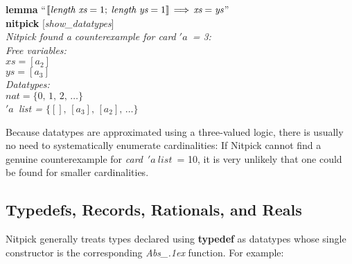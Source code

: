 \documentclass[a4paper,12pt]{article}
\def\unr{\ldots}
\begin{document}
\prew
\textbf{lemma} ``$\mathopen{[\![} \textit{length}~\textit{xs} = 1;\> \textit{length}~\textit{ys} = 1
\mathclose{]\!]} \,\Longrightarrow\, \textit{xs} = \textit{ys}$''
\\
\textbf{nitpick} [\textit{show\_datatypes}] \\[2\smallskipamount]
\slshape Nitpick found a counterexample for \textit{card} $'a$~= 3: \\[2\smallskipamount]
\hbox{}\qquad Free variables: \nopagebreak \\
\hbox{}\qquad\qquad $\textit{xs} = [a_2]$ \\
\hbox{}\qquad\qquad $\textit{ys} = [a_3]$ \\
\hbox{}\qquad Datatypes: \\
\hbox{}\qquad\qquad $\textit{nat} = \{0,\, 1,\, 2,\, \unr\}$ \\
\hbox{}\qquad\qquad $'a$~\textit{list} = $\{[],\, [a_3],\, [a_2],\, \unr\}$
\postw

Because datatypes are approximated using a three-valued logic, there is usually
no need to systematically enumerate cardinalities: If Nitpick cannot find a
genuine counterexample for \textit{card}~$'a~\textit{list}$~= 10, it is very
unlikely that one could be found for smaller cardinalities.

\subsection{Typedefs, Records, Rationals, and Reals}
\label{typedefs-records-rationals-and-reals}

Nitpick generally treats types declared using \textbf{typedef} as datatypes
whose single constructor is the corresponding \textit{Abs\_\kern.1ex} function.
For example:
\end{document}
